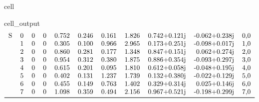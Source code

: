 \documentclass[letterpaper,table,10pt,english]{jupyterBook}
\begin{document}
\begin{sphinxuseclass}{cell}
\begin{sphinxVerbatimOutput}
\begin{sphinxuseclass}{cell_output}
\begin{equation*}
\begin{split}
\begin{tabular}{llllrrrrrrl}
S & 0 &  0 &  0 &  0.752 &  0.246 &  0.161 &  1.826 &  0.742+0.121j & -0.062+0.238j &    0,0 \\
  & 1 &  0 &  0 &  0.305 &  0.100 &  0.966 &  2.965 &  0.173+0.251j & -0.098+0.017j &    1,0 \\
  & 2 &  0 &  0 &  0.860 &  0.281 &  0.177 &  1.348 &  0.847+0.151j &  0.062+0.274j &    2,0 \\
  & 3 &  0 &  0 &  0.954 &  0.312 &  0.380 &  1.875 &  0.886+0.354j & -0.093+0.297j &    3,0 \\
  & 4 &  0 &  0 &  0.615 &  0.201 &  0.095 &  1.810 &  0.612+0.058j & -0.048+0.195j &    4,0 \\
  & 5 &  0 &  0 &  0.402 &  0.131 &  1.237 &  1.739 &  0.132+0.380j & -0.022+0.129j &    5,0 \\
  & 6 &  0 &  0 &  0.455 &  0.149 &  0.763 &  1.402 &  0.329+0.314j &  0.025+0.146j &    6,0 \\
  & 7 &  0 &  0 &  1.098 &  0.359 &  0.494 &  2.156 &  0.967+0.521j & -0.198+0.299j &    7,0 \\
\bottomrule
\end{tabular}\end{split}
\end{equation*}
\end{sphinxuseclass}\end{sphinxVerbatimOutput}

\end{sphinxuseclass}
\end{document}
